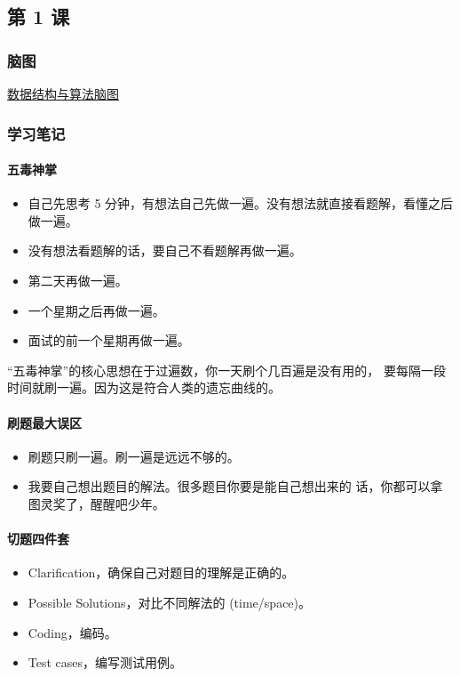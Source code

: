 \subsection{第 1 课}

\subsubsection{脑图}

\href{https://github.com/MDGSF/algorithm005-class02/blob/master/Week_00/G20190343020039/%E7%AE%97%E6%B3%95%E8%84%91%E5%9B%BE.jpeg}{数据结构与算法脑图}

\subsubsection{学习笔记}

\paragraph{五毒神掌}

\begin{itemize}
  \item 自己先思考 5 分钟，有想法自己先做一遍。没有想法就直接看题解，看懂之后做一遍。
  \item 没有想法看题解的话，要自己不看题解再做一遍。
  \item 第二天再做一遍。
  \item 一个星期之后再做一遍。
  \item 面试的前一个星期再做一遍。
\end{itemize}

``五毒神掌''的核心思想在于过遍数，你一天刷个几百遍是没有用的，
要每隔一段时间就刷一遍。因为这是符合人类的遗忘曲线的。

\paragraph{刷题最大误区}

\begin{itemize}
  \item 刷题只刷一遍。刷一遍是远远不够的。
  \item 我要自己想出题目的解法。很多题目你要是能自己想出来的
    话，你都可以拿图灵奖了，醒醒吧少年。
\end{itemize}

\paragraph{切题四件套}

\begin{itemize}
  \item Clarification，确保自己对题目的理解是正确的。
  \item Possible Solutions，对比不同解法的 (time/space)。
  \item Coding，编码。
  \item Test cases，编写测试用例。
\end{itemize}
